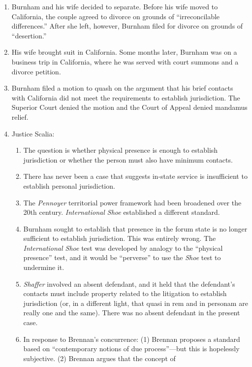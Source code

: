 \begin{enumerate}
    \item Burnham and his wife decided to separate. Before his wife moved to 
    California, the couple agreed to divorce on grounds of ``irreconcilable 
    differences.'' After she left, however, Burnham filed for divorce on 
    grounds of ``desertion.''
    \item His wife brought suit in California. Some months later, Burnham was 
    on a business trip in California, where he was served with court summons 
    and a divorce petition.
    \item Burnham filed a motion to quash on the argument that his brief 
    contacts with California did not meet the requirements to establish 
    jurisdiction. The Superior Court denied the motion and the Court of Appeal 
    denied mandamus relief.
    \item Justice Scalia:
    \begin{enumerate}
        \item The question is whether physical presence is enough to establish 
        jurisdiction or whether the person must also have minimum contacts.
        \item There has never been a case that suggests in-state service is 
        insufficient to establish personal jurisdiction.
        \item The \emph{Pennoyer} territorial power framework had been 
        broadened over the 20th century. \emph{International Shoe} established 
        a different standard.
        \item Burnham sought to establish that presence in the forum state is 
        no longer sufficient to establish jurisdiction. This was entirely 
        wrong.  The \emph{International Shoe} test was developed by analogy to 
        the ``physical presence'' test, and it would be ``perverse'' to use 
        the \emph{Shoe} test to undermine it.
        \item \emph{Shaffer} involved an absent defendant, and it held that 
        the defendant's contacts must include property related to the 
        litigation to establish jurisdiction (or, in a different light, that 
        quasi in rem and in personam are really one and the same). There was 
        no absent defendant in the present case.
        \item In response to Brennan's concurrence: (1) Brennan proposes a 
        standard based on ``contemporary notions of due process''---but this 
        is hopelessly subjective. (2) Brennan argues that the concept of 

\end{enumerate}
\end{enumerate}
